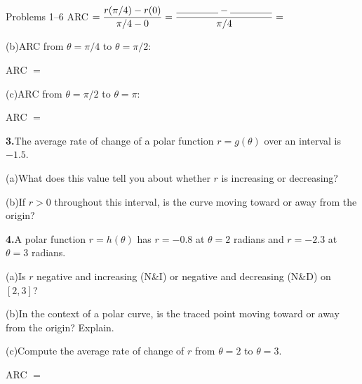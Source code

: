 \documentclass[10pt]{article}
\begin{document}
\begin{notesbox}{Problems 1--6}
\vspace{4pt}
ARC $= \dfrac{r(\pi/4) - r(0)}{\pi/4 - 0} = \dfrac{\rule{1.5cm}{0.4pt} - \rule{1.5cm}{0.4pt}}{\pi/4} = $ \blank{3cm}

\vspace{8pt}
(b)\quad ARC from $\theta = \pi/4$ to $\theta = \pi/2$:

\vspace{4pt}
ARC $= $ \blank{6cm}

\vspace{8pt}
(c)\quad ARC from $\theta = \pi/2$ to $\theta = \pi$:

\vspace{4pt}
ARC $= $ \blank{6cm}

\vspace{0.14in}
\textbf{3.}\quad The average rate of change of a polar function $r = g(\theta)$ over
an interval is $-1.5$.

\vspace{4pt}
(a)\quad What does this value tell you about whether $r$ is increasing or decreasing?

\writeline

\vspace{4pt}
(b)\quad If $r > 0$ throughout this interval, is the curve moving toward or away from the origin?

\writeline

\vspace{0.14in}
\textbf{4.}\quad A polar function $r = h(\theta)$ has $r = -0.8$ at $\theta = 2$ radians and
$r = -2.3$ at $\theta = 3$ radians.

\vspace{4pt}
(a)\quad Is $r$ negative and increasing (N\&I) or negative and decreasing (N\&D) on $[2, 3]$?

\vspace{4pt}
\underline{\hspace{5cm}}

\vspace{4pt}
(b)\quad In the context of a polar curve, is the traced point moving toward or away from the origin?
Explain.

\writeline

\vspace{4pt}
(c)\quad Compute the average rate of change of $r$ from $\theta = 2$ to $\theta = 3$.

\vspace{4pt}
ARC $= $ \blank{5cm}

\end{notesbox}
\end{document}
